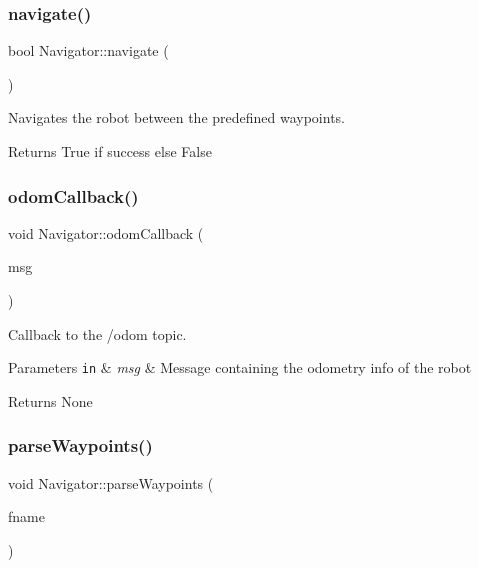 \subsubsection{\texorpdfstring{navigate()}{navigate()}}
{\footnotesize\ttfamily bool Navigator\+::navigate (\begin{DoxyParamCaption}{ }\end{DoxyParamCaption})}



Navigates the robot between the predefined waypoints. 

\begin{DoxyReturn}{Returns}
True if success else False 
\end{DoxyReturn}
\mbox{\label{class_navigator_ae9af300677161b9112dcfcb2bdb818e2}} 
\subsubsection{\texorpdfstring{odom\+Callback()}{odomCallback()}}
{\footnotesize\ttfamily void Navigator\+::odom\+Callback (\begin{DoxyParamCaption}\item[{const nav\+\_\+msgs\+::\+Odometry\+::\+Const\+Ptr \&}]{msg }\end{DoxyParamCaption})}



Callback to the /odom topic. 


\begin{DoxyParams}[1]{Parameters}
\mbox{\tt in}  & {\em msg} & Message containing the odometry info of the robot \\
\hline
\end{DoxyParams}
\begin{DoxyReturn}{Returns}
None 
\end{DoxyReturn}
\mbox{\label{class_navigator_a6580377e81d1bcbedf06526c07ab5951}} 
\subsubsection{\texorpdfstring{parse\+Waypoints()}{parseWaypoints()}}
{\footnotesize\ttfamily void Navigator\+::parse\+Waypoints (\begin{DoxyParamCaption}\item[{std\+::string}]{fname }\end{DoxyParamCaption})}



